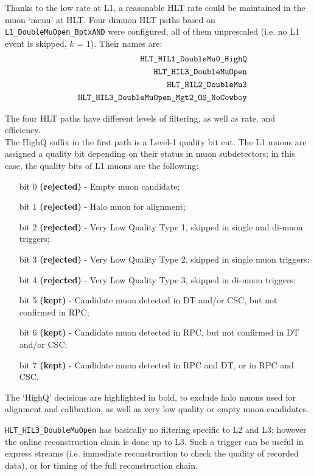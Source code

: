 Thanks to the low rate at L1, a reasonable HLT rate could be
maintained in the muon `menu' at HLT. Four dimuon HLT paths based on
\verb?L1_DoubleMuOpen_BptxAND? were configured, all of them
unprescaled (i.e. no L1 event is skipped, $k$ = 1). Their
names are:
\begin{eqnarray*}
 & &\verb?HLT_HIL1_DoubleMu0_HighQ?\\
 & &\verb?HLT_HIL3_DoubleMuOpen?\\
 & &\verb?HLT_HIL2_DoubleMu3?\\
 & &\verb?HLT_HIL3_DoubleMuOpen_Mgt2_OS_NoCowboy?
\end{eqnarray*}

The four HLT paths have different levels of filtering, as well as
rate, and efficiency.
\\
The HighQ suffix in the first path is a Level-1 quality bit cut. The
L1 muons are assigned a quality bit depending on their status in muon
subdetectors; in this case, the quality bits of L1 muons are the
following:
\begin{itemize}
\item[bit 0] \textbf{(rejected)} - Empty muon candidate;
\item[bit 1] \textbf{(rejected)} - Halo muon for alignment;
\item[bit 2] \textbf{(rejected)} - Very Low Quality Type 1, skipped in
  single and di-muon triggers;
\item[bit 3] \textbf{(rejected)} - Very Low Quality Type 2, skipped in
  single muon triggers;
\item[bit 4] \textbf{(rejected)} - Very Low Quality Type 3, skipped in
  di-muon triggers;
\item[bit 5] \textbf{(kept)} - Candidate muon detected in DT and/or CSC, but not
  confirmed in RPC;
\item[bit 6] \textbf{(kept)} - Candidate muon detected in RPC, but not
  confirmed in DT and/or CSC;
\item[bit 7] \textbf{(kept)} - Candidate muon detected in RPC and DT, or in
  RPC and CSC.
\end{itemize}

The `HighQ' decisions are highlighted in bold, to exclude halo muons
used for alignment and calibration, as well as very low quality or empty muon
candidates.

\verb?HLT_HIL3_DoubleMuOpen? has basically no filtering specific to L2 and L3;
however the online reconstruction chain is done up to L3. Such a
trigger can be useful in express streams (i.e. immediate
reconstruction to check the quality of recorded data), or for timing
of the full reconstruction chain.


